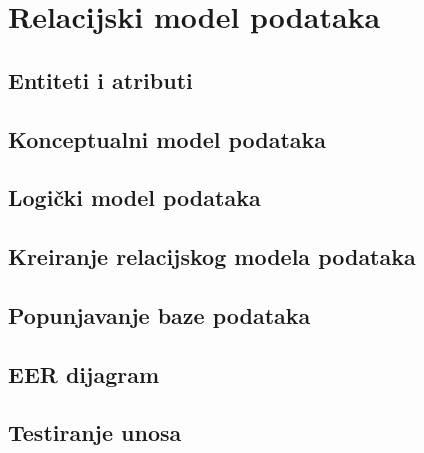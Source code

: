 \section{Relacijski model podataka}

\subsection{Entiteti i atributi}
\subsection{Konceptualni model podataka}
\subsection{Logički model podataka}
\subsection{Kreiranje relacijskog modela podataka}
\subsection{Popunjavanje baze podataka}
\subsection{EER dijagram}
\subsection{Testiranje unosa}